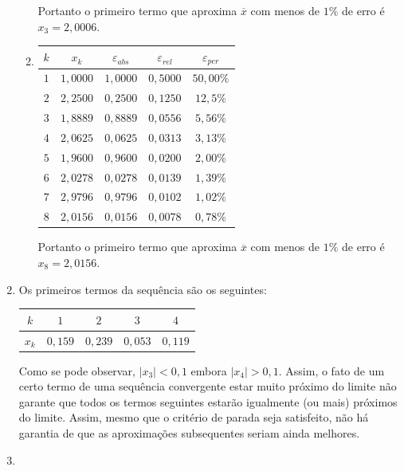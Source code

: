 \documentclass[12pt,a4paper]{article}
\begin{document}
\begin{enumerate}
\begin{enumerate}
Portanto o primeiro termo que aproxima $\overline{x}$ com menos de $1\%$ de erro é $x_3 = 2,0006$.
\item
\begin{tabular}{|c|c|c|c|c|}
\hline
$k$ & $x_k$ & $\varepsilon_{abs}$ & $\varepsilon_{rel}$ & $\varepsilon_{per}$ \\
\hline
$1$ & $1,0000$ & $1,0000$ & $0,5000$ & $50,00\%$ \\
\hline
$2$ & $2,2500$ & $0,2500$ & $0,1250$ & $12,5\%$ \\
\hline
$3$ & $1,8889$ & $0,8889$ & $0,0556$ & $5,56\%$ \\
\hline
$4$ & $2,0625$ & $0,0625$ & $0,0313$ & $3,13\%$ \\
\hline
$5$ & $1,9600$ & $0,9600$ & $0,0200$ & $2,00\%$ \\
\hline
$6$ & $2,0278$ & $0,0278$ & $0,0139$ & $1,39\%$ \\
\hline
$7$ & $2,9796$ & $0,9796$ & $0,0102$ & $1,02\%$ \\
\hline
$8$ & $2,0156$ & $0,0156$ & $0,0078$ & $0,78\%$ \\
\hline
\end{tabular}

Portanto o primeiro termo que aproxima $\overline{x}$ com menos de $1\%$ de erro é $x_8 = 2,0156$.
\end{enumerate}
\item Os primeiros termos da sequência são os seguintes:
\begin{center}
\begin{tabular}{|c|c|c|c|c|}
\hline
$k$   & $1$   & $2$   & $3$   & $4$\\
\hline
$x_k$ & $0,159$ & $0,239$ & $0,053$ & $0,119$ \\
\hline
\end{tabular}
\end{center}
Como se pode observar, $|x_3| < 0,1$ embora $|x_4| > 0,1$. Assim, o fato de um certo termo de uma sequência convergente estar muito próximo do limite não garante que todos os termos seguintes estarão igualmente (ou mais) próximos do limite. Assim, mesmo que o critério de parada seja satisfeito, não há garantia de que as aproximações subsequentes seriam ainda melhores.
\item


\end{enumerate}
\end{document}
